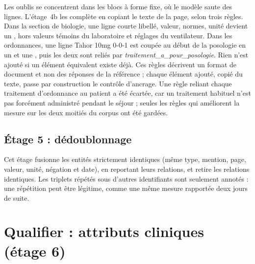 Les oublis se concentrent dans les blocs à forme fixe, où le modèle saute des lignes. L'étage~4b les complète en copiant le texte de la page, selon trois règles. Dans la section de biologie, une ligne courte \og libellé, valeur, normes, unité \fg{} devient un , hors valeurs témoins du laboratoire et réglages du ventilateur. Dans les ordonnances, une ligne \og Tahor 10mg 0-0-1 \fg{} est coupée au début de la posologie en un  et une , puis les deux sont reliés par \emph{traitement\_a\_pour\_posologie}. Rien n'est ajouté si un élément équivalent existe déjà. Ces règles décrivent un format de document et non des réponses de la référence ; chaque élément ajouté, copié du texte, passe par construction le contrôle d'ancrage. Une règle reliant chaque traitement d'ordonnance au patient a été écartée, car un traitement habituel n'est pas forcément administré pendant le séjour ; seules les règles qui améliorent la mesure sur les deux moitiés du corpus ont été gardées.

\subsection{Étage 5 : dédoublonnage}\label{sec:c5-etage5}

Cet étage fusionne les entités strictement identiques (même type, mention, page, valeur, unité, négation et date), en reportant leurs relations, et retire les relations identiques. Les triplets répétés sous d'autres identifiants sont seulement annotés : une répétition peut être légitime, comme une même mesure rapportée deux jours de suite.

\section{Qualifier : attributs cliniques (étage 6)}\label{sec:c5-etage6}

